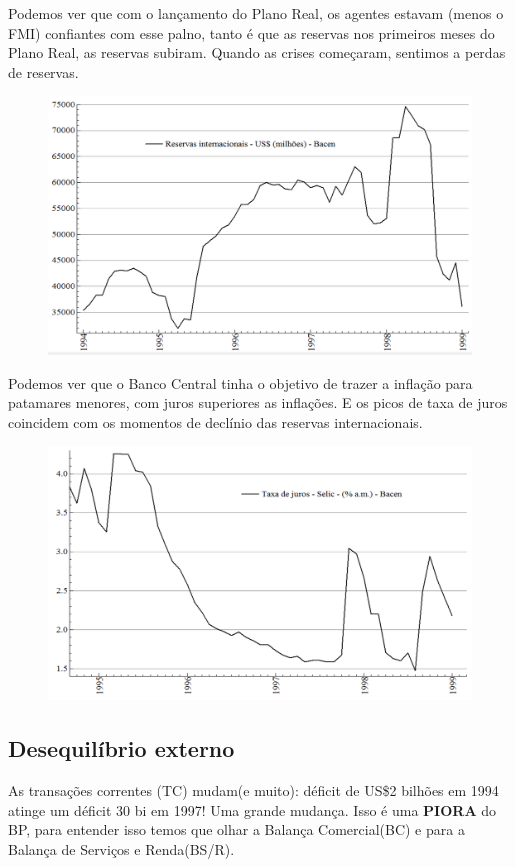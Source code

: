 \documentclass[a4paper,12pt]{article}[abntex2]
\begin{document}
Podemos ver que com o lançamento do Plano Real, os agentes estavam (menos o FMI) confiantes com esse palno, tanto é que as reservas nos primeiros meses do Plano Real, as reservas subiram. Quando as crises começaram, sentimos a perdas de reservas.

\begin{figure}[H]
    \centering
    \includegraphics[width=0.7\linewidth]{Imagens/a14i2.png}
\end{figure}

Podemos ver que o Banco Central tinha o objetivo de trazer a inflação para patamares menores, com juros superiores as inflações. E os picos de taxa de juros coincidem com os momentos de declínio das reservas internacionais.

\begin{figure}[H]
    \centering
    \includegraphics[width=0.7\linewidth]{Imagens/a14i3.png}
\end{figure}

\subsection{\textbf{Desequilíbrio externo}}
As transações correntes (TC) mudam(e muito): déficit de US\$2 bilhões em 1994 atinge um déficit 30 bi em 1997! Uma grande mudança. Isso é uma \textbf{PIORA} do BP, para entender isso temos que olhar a Balança Comercial(BC) e para a Balança de Serviços e Renda(BS/R). 
\end{document}
